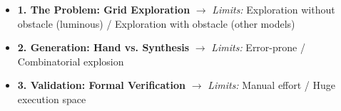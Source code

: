\begin{frame}{}

\begin{itemize}
  \item \textbf{1. The Problem: Grid Exploration}
        \newline {\footnotesize\textcolor{softgray}{[Bramas et al. 2021, Sardar et al. 2024]}}
        \newline $\rightarrow$ \textit{Limits:} Exploration without obstacle (luminous) / Exploration with obstacle (other models)
  \vspace{0.4cm}

  \item \textbf{2. Generation: Hand vs. Synthesis}
        \newline {\footnotesize\textcolor{softgray}{[Bonnet et al. 2014, Millet et al. 2014]}}
        \newline $\rightarrow$ \textit{Limits:} Error-prone / Combinatorial explosion
  \vspace{0.4cm}

  \item \textbf{3. Validation: Formal Verification}
        \newline {\footnotesize\textcolor{softgray}{[Bérard et al. 2016, Courtieu et al. 2022]}}
        \newline $\rightarrow$ \textit{Limits:} Manual effort / Huge execution space
\end{itemize}

\end{frame}